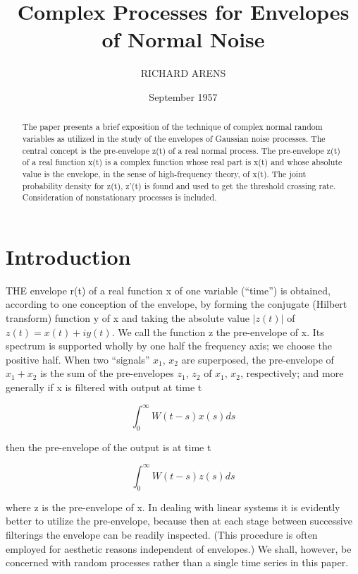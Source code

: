 \documentclass[10pt,twocolumn]{article}
\title{Complex Processes for Envelopes of Normal Noise}
\author{RICHARD ARENS}
\date{September 1957}
\theoremstyle{definition}
\begin{document}
\maketitle

\begin{abstract}
The paper presents a brief exposition of the technique of complex normal random variables as utilized in the study of the envelopes of Gaussian noise processes. The central concept is the pre-envelope z(t) of a real normal process. The pre-envelope z(t) of a real function x(t) is a complex function whose real part is x(t) and whose absolute value is the envelope, in the sense of high-frequency theory, of x(t). The joint probability density for z(t), z'(t) is found and used to get the threshold crossing rate. Consideration of nonstationary processes is included.
\end{abstract}

\section{Introduction}
THE envelope r(t) of a real function x of one variable (``time'') is obtained, according to one conception of the envelope, by forming the conjugate (Hilbert transform) function y of x and taking the absolute value $|z(t)|$ of $z(t) = x(t) + iy(t)$. We call the function z the pre-envelope of x. Its spectrum is supported wholly by one half the frequency axis; we choose the positive half. When two ``signals'' $x_1$, $x_2$ are superposed, the pre-envelope of $x_1 + x_2$ is the sum of the pre-envelopes $z_1$, $z_2$ of $x_1$, $x_2$, respectively; and more generally if x is filtered with output at time t

\begin{equation}
\label{eq:filtered_output}
\int_0^{\infty} W(t - s)x(s) ds
\end{equation}

then the pre-envelope of the output is at time t

\begin{equation}
\label{eq:pre_envelope_output}
\int_0^{\infty} W(t - s)z(s) ds
\end{equation}

where z is the pre-envelope of x. In dealing with linear systems it is evidently better to utilize the pre-envelope, because then at each stage between successive filterings the envelope can be readily inspected. (This procedure is often employed for aesthetic reasons independent of envelopes.) We shall, however, be concerned with random processes rather than a single time series in this paper.
\end{document}
